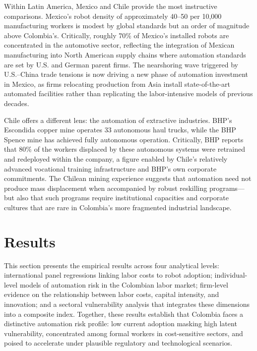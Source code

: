 \documentclass{article}
\begin{document}
Within Latin America, Mexico and Chile provide the most instructive comparisons. Mexico's robot density of approximately 40--50 per 10,000 manufacturing workers is modest by global standards but an order of magnitude above Colombia's. Critically, roughly 70\% of Mexico's installed robots are concentrated in the automotive sector, reflecting the integration of Mexican manufacturing into North American supply chains where automation standards are set by U.S. and German parent firms. The nearshoring wave triggered by U.S.--China trade tensions is now driving a new phase of automation investment in Mexico, as firms relocating production from Asia install state-of-the-art automated facilities rather than replicating the labor-intensive models of previous decades.

Chile offers a different lens: the automation of extractive industries. BHP's Escondida copper mine operates 33 autonomous haul trucks, while the BHP Spence mine has achieved fully autonomous operation. Critically, BHP reports that 80\% of the workers displaced by these autonomous systems were retrained and redeployed within the company, a figure enabled by Chile's relatively advanced vocational training infrastructure and BHP's own corporate commitments. The Chilean mining experience suggests that automation need not produce mass displacement when accompanied by robust reskilling programs---but also that such programs require institutional capacities and corporate cultures that are rare in Colombia's more fragmented industrial landscape.


\section{Results}
\label{sec:results}

This section presents the empirical results across four analytical levels: international panel regressions linking labor costs to robot adoption; individual-level models of automation risk in the Colombian labor market; firm-level evidence on the relationship between labor costs, capital intensity, and innovation; and a sectoral vulnerability analysis that integrates these dimensions into a composite index. Together, these results establish that Colombia faces a distinctive automation risk profile: low current adoption masking high latent vulnerability, concentrated among formal workers in cost-sensitive sectors, and poised to accelerate under plausible regulatory and technological scenarios.
\end{document}
